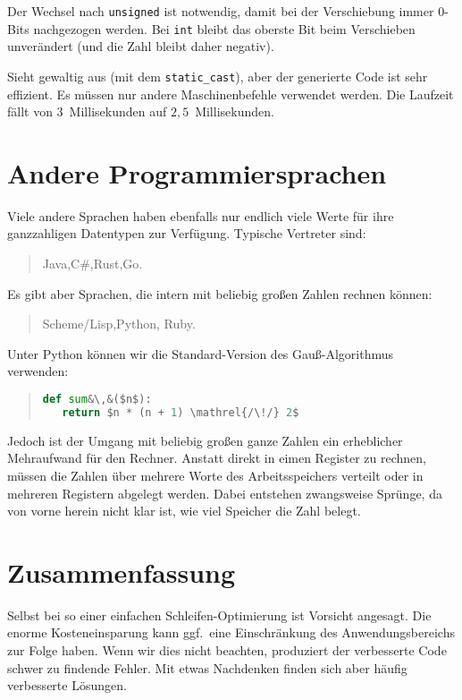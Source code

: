\documentclass[a5paper,landscape,ngerman,10pt]{article}
\begin{document}
Der Wechsel nach \lstinline!unsigned! ist notwendig, damit
bei der Verschiebung immer $0$-Bits nachgezogen werden.
Bei \lstinline!int! bleibt das oberste Bit beim Verschieben unverändert
(und die Zahl bleibt daher negativ).

Sieht gewaltig aus (mit dem \lstinline!static_cast!), aber
der generierte Code ist sehr effizient.
Es müssen nur andere Maschinenbefehle verwendet werden.
Die Laufzeit fällt von 3~Millisekunden auf $2{,}5$~Millisekunden.

\section{Andere Programmiersprachen}

Viele andere Sprachen haben ebenfalls nur endlich viele Werte für ihre
ganzzahligen Datentypen zur Verfügung.
Typische Vertreter sind:

\begin{quotation}
 Java,\qquad C\#,\qquad Rust,\qquad Go.
\end{quotation}

Es gibt aber Sprachen, die intern mit beliebig großen
Zahlen rechnen können:

\begin{quotation}
 Scheme/Lisp,\qquad Python, \qquad Ruby.
\end{quotation}

Unter Python können wir die Standard-Version des Gauß-Algorithmus verwenden:

\begin{quotation}
\begin{lstlisting}[language=Python]
def sum&\,&($n$):
   return $n * (n + 1) \mathrel{/\!/} 2$
\end{lstlisting}
\end{quotation}

Jedoch ist der Umgang mit beliebig großen ganze Zahlen
ein erheblicher Mehraufwand für den Rechner.
Anstatt direkt in eimen Register zu rechnen, müssen die
Zahlen über mehrere Worte des Arbeitsspeichers verteilt
oder in mehreren Registern abgelegt werden.
Dabei entstehen zwangsweise Sprünge, da von vorne herein
nicht klar ist, wie viel Speicher die Zahl belegt.

\section{Zusammenfassung}

Selbst bei so einer einfachen Schleifen-Optimierung ist
Vorsicht angesagt.
Die enorme Kosteneinsparung kann ggf.\ eine Einschränkung
des Anwendungsbereichs zur Folge haben.
Wenn wir dies nicht beachten, produziert der verbesserte
Code schwer zu findende Fehler.
Mit etwas Nachdenken finden sich aber häufig verbesserte
Lösungen.
\end{document}
